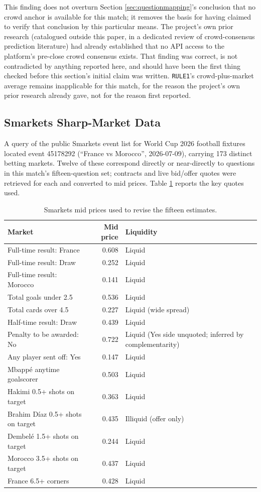 \documentclass[11pt]{article}
\begin{document}
This finding does not overturn Section \ref{sec:questionmapping}'s conclusion that no
crowd anchor is available for this match; it removes the basis for having claimed to
verify that conclusion by this particular means. The project's own prior research
(catalogued outside this paper, in a dedicated review of crowd-consensus prediction
literature) had already established that no API access to the platform's pre-close crowd
consensus exists. That finding was correct, is not contradicted by anything reported
here, and should have been the first thing checked before this section's initial claim
was written. \texttt{RULE1}'s crowd-plus-market average remains inapplicable for this
match, for the reason the project's own prior research already gave, not for the reason
first reported.

\subsection{Smarkets Sharp-Market Data}

A query of the public Smarkets event list for World Cup 2026 football fixtures located
event 45178292 (``France vs Morocco'', 2026-07-09), carrying 173 distinct betting
markets. Twelve of these correspond directly or near-directly to questions in this
match's fifteen-question set; contracts and live bid/offer quotes were retrieved for each
and converted to mid prices. Table \ref{tab:marketquotes} reports the key quotes used.

\begin{table}[H]
\centering
\caption{Smarkets mid prices used to revise the fifteen estimates.}
\label{tab:marketquotes}
\begin{tabular}{p{6.4cm}rl}
\toprule
Market & Mid price & Liquidity \\
\midrule
Full-time result: France & 0.608 & Liquid \\
Full-time result: Draw & 0.252 & Liquid \\
Full-time result: Morocco & 0.141 & Liquid \\
Total goals under 2.5 & 0.536 & Liquid \\
Total cards over 4.5 & 0.227 & Liquid (wide spread) \\
Half-time result: Draw & 0.439 & Liquid \\
Penalty to be awarded: No & 0.722 & Liquid (Yes side unquoted; inferred by complementarity) \\
Any player sent off: Yes & 0.147 & Liquid \\
Mbapp\'e anytime goalscorer & 0.503 & Liquid \\
Hakimi 0.5+ shots on target & 0.363 & Liquid \\
Brahim D\'iaz 0.5+ shots on target & 0.435 & Illiquid (offer only) \\
Dembel\'e 1.5+ shots on target & 0.244 & Liquid \\
Morocco 3.5+ shots on target & 0.437 & Liquid \\
France 6.5+ corners & 0.428 & Liquid \\
\bottomrule
\end{tabular}
\end{table}
\end{document}
